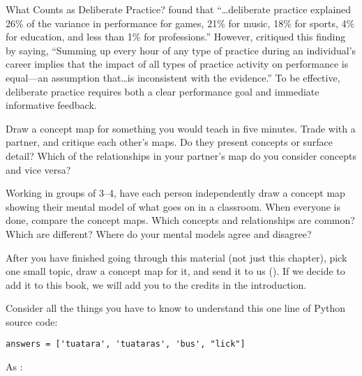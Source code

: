 \begin{aside}{What Counts as Deliberate Practice?}
  \cite{Macn2014} found that ``{\ldots}deliberate practice
  explained 26\% of the variance in performance for games, 21\% for music,
  18\% for sports, 4\% for education, and less than 1\% for professions.''
  However, \cite{Eric2016} critiqued this finding by saying, ``Summing
  up every hour of any type of practice during an individual's career
  implies that the impact of all types of practice activity on
  performance is equal---an assumption that{\ldots}is inconsistent
  with the evidence.'' To be effective, deliberate practice requires both
  a clear performance goal and immediate informative feedback.
\end{aside}



Draw a concept map for something you would teach in five minutes. Trade
with a partner, and critique each other's maps. Do they present concepts
or surface detail? Which of the relationships in your partner's map do
you consider concepts and vice versa?


Working in groups of 3--4, have each person independently draw a concept
map showing their mental model of what goes on in a classroom. When
everyone is done, compare the concept maps. Which concepts and
relationships are common? Which are different? Where do your mental
models agree and disagree?


After you have finished going through this material (not just this
chapter), pick one small topic, draw a concept map for it, and send it
to us (). If we decide to add it to this book, we
will add you to the credits in the introduction.


Consider all the things you have to know to understand this one line of
Python source code:

\begin{verbatim}
answers = ['tuatara', 'tuataras', 'bus', "lick"]
\end{verbatim}

As :

